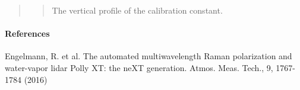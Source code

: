 \documentclass[letterpaper,10pt,english]{sphinxmanual}
\begin{document}
\begin{fulllineitems}
\begin{quote}
\begin{description}
\begin{quote}
The vertical profile of the calibration constant.
\end{quote}

\end{description}\end{quote}
\paragraph{References}

Engelmann, R. et al. The automated multiwavelength Raman polarization and water-vapor lidar
Polly XT: the neXT generation. Atmos. Meas. Tech., 9, 1767-1784 (2016)

\end{fulllineitems}

\end{document}
